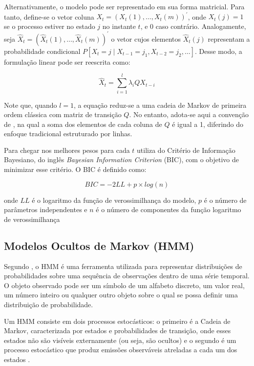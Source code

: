 \documentclass[
    12pt,                %
    openright,           %
    oneside,             %
    a4paper,             %
    english,             %
    brazil               %
]{abntex2}
\begin{document}
Alternativamente, o modelo pode ser representado em sua forma matricial. Para tanto, define-se o vetor coluna $X_t = (X_t(1), \dots, X_t(m))^\prime$, onde $X_t(j) = 1$ 
se o processo estiver no estado $j$ no instante $t$, e $0$ caso contrário. Analogamente, seja $\hat{X}_t = (\hat{X}_t(1), \dots, \hat{X}_t(m))^\prime$ o vetor cujos 
elementos $\hat{X}_t(j)$ representam a probabilidade condicional $P[X_t = j \mid X_{t-1} = j_1, X_{t-2} = j_2, \dots]$. Desse modo, a formulação linear pode ser 
reescrita como:

\begin{equation}
    \hat{X}_t = \sum_{i = 1}^{l} \lambda_i Q X_{t-i}
\end{equation}

Note que, quando $l = 1$, a equação reduz-se a uma cadeia de Markov de primeira ordem clássica com matriz de transição $Q$. No entanto, adota-se aqui a convenção de 
, na qual a soma dos elementos de cada coluna de $Q$ é igual a 1, diferindo do enfoque tradicional estruturado por linhas.

Para chegar nos melhores pesos para cada $t$  utiliza do Critério de Informação Bayesiano, do inglês \textit{Bayesian Information Criterion} 
(BIC), com o objetivo de minimizar esse critério. O BIC é definido como:

\begin{equation}
    BIC = -2LL + p \times log(n)    
\end{equation}

onde $LL$ é o logaritmo da função de verossimilhança do modelo, $p$ é o número de parâmetros independentes e $n$ é o número de componentes da função logaritmo de 
verossimilhança \cite{RAFTERY1985}

\subsection{Modelos Ocultos de Markov (HMM)}

Segundo , o HMM é uma ferramenta utilizada para representar
distribuições de probabilidades sobre uma sequência de observações dentro de uma série temporal. 
O objeto observado pode ser um símbolo de um alfabeto discreto, um valor real, um número inteiro ou qualquer 
outro objeto sobre o qual se possa definir uma distribuição de probabilidade.

Um HMM consiste em dois processos estocásticos: o primeiro é a Cadeia de Markov, caracterizada por estados e 
probabilidades de transição, onde esses estados não são visíveis externamente (ou seja, são ocultos) e o segundo é um 
processo estocástico que produz emissões observáveis atreladas a cada um dos estados \cite{Dymarski}.
\end{document}

